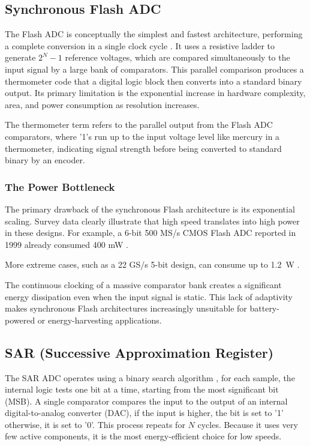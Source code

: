 \subsection{Synchronous Flash ADC}
The Flash ADC is conceptually the simplest and fastest architecture, performing a complete conversion in a single clock cycle \cite{baker_cmos_2010}. It uses a resistive ladder to generate $2^N-1$ reference voltages, which are compared simultaneously to the input signal by a large bank of comparators. This parallel comparison produces a thermometer code that a digital logic block then converts into a standard binary output. Its primary limitation is the exponential increase in hardware complexity, area, and power consumption as resolution increases.

The thermometer term refers to the parallel output from the Flash ADC comparators, where '1's run up to the input voltage level like mercury in a thermometer, indicating signal strength before being converted to standard binary by an encoder.

\subsubsection{The Power Bottleneck}
The primary drawback of the synchronous Flash architecture is its exponential scaling. Survey data clearly illustrate that high speed translates into high power in these designs. For example, a 6-bit 500 MS/s CMOS Flash ADC reported in 1999 already consumed 400 mW \cite{YukoTambaandKazuoYamakido_1999_2}. 

More extreme cases, such as a 22 GS/s 5-bit design, can consume up to 1.2~W \cite{Schvan_2006}.

The continuous clocking of a massive comparator bank creates a significant energy dissipation even when the input signal is static. This lack of adaptivity makes synchronous Flash architectures increasingly unsuitable for battery-powered or energy-harvesting applications.

\subsection{SAR (Successive Approximation Register)}
The SAR ADC operates using a binary search algorithm \cite{van_de_plassche_1994}, for each sample, the internal logic tests one bit at a time, starting from the most significant bit (MSB). A single comparator compares the input to the output of an internal digital-to-analog converter (DAC), if the input is higher, the bit is set to '1' otherwise, it is set to '0'. This process repeats for $N$ cycles. Because it uses very few active components, it is the most energy-efficient choice for low speeds.

